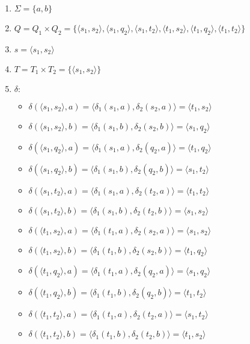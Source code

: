 \documentclass[a4paper, 12pt]{article}
\begin{document}
\begin{enumerate}
    \item $ \Sigma = \{ a, b \} $
    \item $ Q = Q_1 \times Q_2 = \{ \langle s_1, s_2 \rangle, \langle s_1, q_2 \rangle, \langle s_1, t_2 \rangle, \langle t_1, s_2 \rangle, \langle t_1, q_2 \rangle, \langle t_1, t_2 \rangle \} $ 
    \item $ s = \langle s_1, s_2 \rangle $
    \item $ T = T_1 \times T_2 = \{ \langle s_1, s_2 \rangle \}$
    \item $ \delta : $
    \begin{itemize}
        \item $ \delta (\langle s_1, s_2 \rangle, a) = \langle \delta_1 (s_1, a), \delta_2 (s_2, a) \rangle = \langle t_1, s_2 \rangle $
        \item $ \delta (\langle s_1, s_2 \rangle, b) = \langle \delta_1 (s_1, b), \delta_2 (s_2, b) \rangle = \langle s_1, q_2 \rangle $
        
        \item $ \delta (\langle s_1, q_2 \rangle, a) = \langle \delta_1 (s_1, a), \delta_2 (q_2, a) \rangle = \langle t_1, q_2 \rangle $
        \item $ \delta (\langle s_1, q_2 \rangle, b) = \langle \delta_1 (s_1, b), \delta_2 (q_2, b) \rangle = \langle s_1, t_2 \rangle $
        
        \item $ \delta (\langle s_1, t_2 \rangle, a) = \langle \delta_1 (s_1, a), \delta_2 (t_2, a) \rangle = \langle t_1, t_2 \rangle $
        \item $ \delta (\langle s_1, t_2 \rangle, b) = \langle \delta_1 (s_1, b), \delta_2 (t_2, b) \rangle = \langle s_1, s_2 \rangle $
        
        \item $ \delta (\langle t_1, s_2 \rangle, a) = \langle \delta_1 (t_1, a), \delta_2 (s_2, a) \rangle = \langle s_1, s_2 \rangle $
        \item $ \delta (\langle t_1, s_2 \rangle, b) = \langle \delta_1 (t_1, b), \delta_2 (s_2, b) \rangle = \langle t_1, q_2 \rangle $
        
        \item $ \delta (\langle t_1, q_2 \rangle, a) = \langle \delta_1 (t_1, a), \delta_2 (q_2, a) \rangle = \langle s_1, q_2 \rangle $
        \item $ \delta (\langle t_1, q_2 \rangle, b) = \langle \delta_1 (t_1, b), \delta_2 (q_2, b) \rangle = \langle t_1, t_2 \rangle $
        
        \item $ \delta (\langle t_1, t_2 \rangle, a) = \langle \delta_1 (t_1, a), \delta_2 (t_2, a) \rangle = \langle s_1, t_2 \rangle $
        \item $ \delta (\langle t_1, t_2 \rangle, b) = \langle \delta_1 (t_1, b), \delta_2 (t_2, b) \rangle = \langle t_1, s_2 \rangle $
    \end{itemize}
\end{enumerate}
\end{document}
